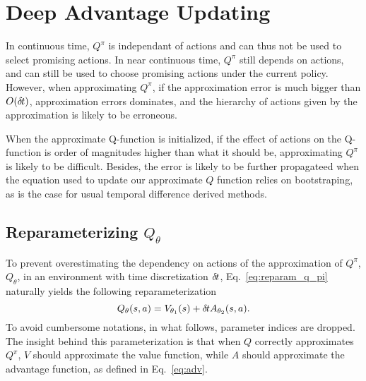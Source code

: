 \section{Deep Advantage Updating}
In continuous time, $Q^\pi$ is independant of actions and can thus not be used
to select promising actions.  In near continuous time, $Q^\pi$ still depends on
actions, and can still be used to choose promising actions under the current
policy. However, when approximating $Q^\pi$, if the approximation error is much
bigger than $O(\delta\hspace{-.1em}t)$, approximation errors dominates, and the hierarchy
of actions given by the approximation is likely to be erroneous.

When the approximate Q-function is initialized, if the effect of actions on the
Q-function is order of magnitudes higher than what it should be, approximating
$Q^\pi$ is likely to be difficult. Besides, the error is likely to be further
propagateed when the equation used to update our approximate $Q$ function
relies on bootstraping, as is the case for usual temporal difference derived methods.

\subsection{Reparameterizing $Q_\theta$}
\label{subsec:reparam}
To prevent overestimating the dependency on actions of the approximation of
$Q^\pi$, $Q_\theta$, in an environment with time discretization $\delta\hspace{-.1em}t$,
Eq.~\eqref{eq:reparam_q_pi} naturally yields the following reparameterization
\begin{equation}
	Q_\theta(s, a) = V_{\theta_1}(s) + \delta\hspace{-.1em}t A_{\theta_2}(s, a).
\end{equation}
To avoid cumbersome notations, in what follows, parameter indices are dropped.
The insight behind this parameterization is that when $Q$ correctly
approximates $Q^\pi$, $V$ should approximate the value function, while $A$
should approximate the advantage function, as defined in Eq.~\eqref{eq:adv}.


